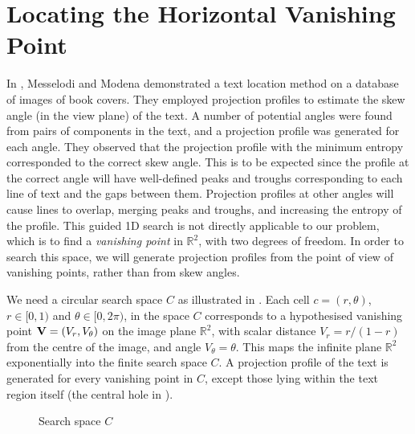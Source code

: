 \section{Locating the Horizontal Vanishing Point}  \label{locatehvpsect}

In \cite{messelod1}, Messelodi and Modena demonstrated a text location method
on a database of images of book covers.  They employed projection profiles to
estimate the skew angle (in the view plane) of the text.
A number of potential angles were found from pairs of components in the text,
and a projection profile was generated for each angle.  They observed that the
projection profile with the minimum entropy corresponded to the correct skew
angle.  
This is to be expected since the
profile at the correct angle will have well-defined peaks
and troughs corresponding to each line of text and the gaps
between them.  Projection profiles at other angles will cause
lines to overlap, merging peaks and troughs, and increasing the
entropy of the profile.
This guided 1D search is not directly applicable to our problem, which is to
find a {\em vanishing point} in $\mathbb{R}^2$, with two degrees of freedom. 
In order to search this space, we will generate projection profiles
from the point of view of vanishing points, rather than from skew angles.


We need a circular search space $C$ as illustrated in .
Each cell $c=(r,\theta)$, $r\in[0,1)$ and $\theta\in[0,2\pi)$, in the space $C$
corresponds to a hypothesised vanishing point ${ \bf V } = (V_r,V_{\theta})$ on
the image plane $\mathbb{R}^2$, with scalar distance $V_{r}=r/{(1-r)}$ from the
centre of the image, and angle $V_{\theta}=\theta$.  This maps the infinite
plane $\mathbb{R}^2$ exponentially into the finite search space $C$.
A projection profile of the text is generated for
every vanishing point in $C$, except those lying within
the text region itself (the central hole in ).


\begin{figure}[h!]
\centering
\begin{center}
\hspace{5mm}
\end{center}
\vspace*{0mm}
\caption{Search space $C$}
\label{searchspace}
\end{figure}

